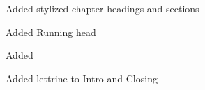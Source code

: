 \documentclass[Coomer-main.tex]{subfiles}
\begin{document}
\label{ch:changelog}

\begin{changelog}

\begin{version}[v=3.0.0, date=2020-11-20, author=PDFanon, simple]
	\item Added stylized chapter headings and sections
	\item Added Running head
	\item Added 
	\item Added lettrine to Intro and Closing
\end{version}

\end{changelog}
\end{document}
